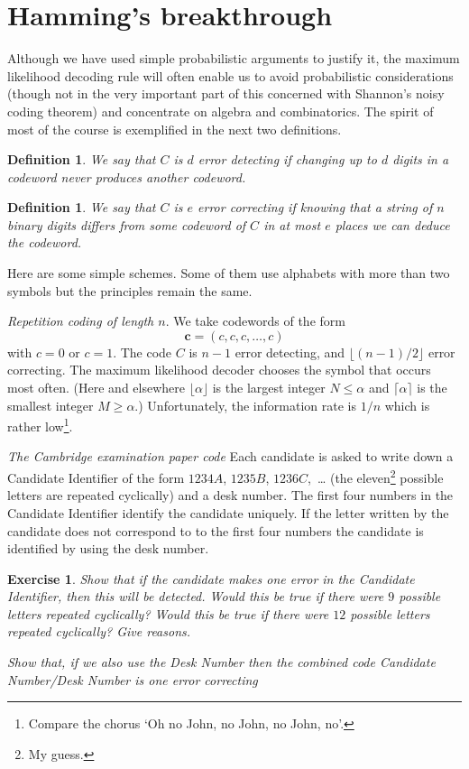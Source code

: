 \documentclass[12pt,a4paper]{article}
\theoremstyle{plain}
\newtheorem{definition}[theorem]{Definition}
\newtheorem{exercise}[theorem]{Exercise}
\theoremstyle{definition}
\begin{document}
    \section{Hamming's breakthrough}
    Although we have used simple probabilistic arguments
    to justify it, the maximum likelihood decoding rule
    will often enable us to avoid probabilistic considerations
    (though not in the very important part of this concerned with
    Shannon's noisy coding theorem) and concentrate on
    algebra and combinatorics.
    The spirit of most of the course is exemplified in the
    next two definitions.
    \begin{definition}
        We say that $C$ is $d$ \emph{error detecting}
        if changing up to $d$ digits in a codeword never produces
        another codeword.
    \end{definition}
    \begin{definition}
        We say that $C$ is $e$
        \emph{error correcting}
        if knowing that a string of $n$ binary digits differs
        from some codeword of $C$ in at most
        $e$ places we can deduce the codeword.
    \end{definition}

    Here are some simple schemes. Some of them use alphabets with
    more than two symbols but the principles remain the same.

    \noindent\emph{Repetition coding of length $n$}.
    We take codewords of the form
    \[{\mathbf c}=(c,c,c,\dots,c)\]
    with $c=0$ or $c=1$. The code $C$ is $n-1$ error detecting,
    and $\lfloor (n-1)/2\rfloor$ error correcting.
    The maximum likelihood decoder chooses the
    symbol that occurs most often.
    (Here and elsewhere $\lfloor \alpha\rfloor$ is the largest
    integer $N\leq\alpha$ and $\lceil \alpha \rceil$ is
    the smallest integer $M\geq\alpha$.) Unfortunately,
    the information rate is $1/n$ which is
    rather low\footnote{Compare
    the chorus `Oh no John, no John, no John, no'.}.

    \noindent\emph{The Cambridge examination paper code}
    Each candidate is asked to write down a Candidate Identifier of the
    form
    $1234A$, $1235B$, $1236C$,\ \dots
    (the eleven\footnote{My guess.} possible letters are repeated cyclically)
    and a desk number. The first four numbers
    in the Candidate Identifier identify the candidate
    uniquely. If the letter written by the
    candidate does not correspond to
    to the first four numbers the candidate is identified
    by using the desk number.
    \begin{exercise}
        \label{E;Cambridge exam}
        Show that if the candidate makes one error
        in the Candidate Identifier,
        then this will be detected.
        Would this be true if there were $9$ possible
        letters repeated cyclically? Would this be true
        if there were $12$ possible
        letters repeated cyclically?
        Give reasons.

        Show that, if we also use the Desk Number
        then the combined code Candidate Number/Desk Number
        is one error correcting
    \end{exercise}
\end{document}
